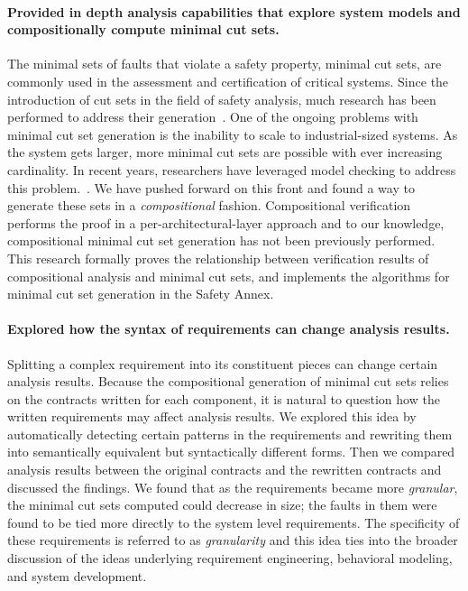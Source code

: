 \paragraph{Provided in depth analysis capabilities that explore system models and compositionally compute minimal cut sets.}
The minimal sets of faults that violate a safety property, minimal cut sets, are commonly used in the assessment and certification of critical systems. Since the introduction of cut sets in the field of safety analysis, much research has been performed to address their generation~\cite{fta:survey,rauzy1993new,historyFTA,Bozzano:2010:DSA:1951720,rausand2003system}. One of the ongoing problems with minimal cut set generation is the inability to scale to industrial-sized systems. As the system gets larger, more minimal cut sets are possible with ever increasing cardinality. In recent years, researchers have leveraged model checking to address this problem.~\cite{bieber2002combination,schafer2003combining,fta:survey,contractBasedDesign,symbFTA,DBLP:conf/cav/BozzanoCPJKPRT15}. We have pushed forward on this front and found a way to generate these sets in a \emph{compositional} fashion. Compositional verification performs the proof in a per-architectural-layer approach and to our knowledge, compositional minimal cut set generation has not been previously performed. This research formally proves the relationship between verification results of compositional analysis and minimal cut sets, and implements the algorithms for minimal cut set generation in the Safety Annex.

\paragraph{Explored how the syntax of requirements can change analysis results.}
Splitting a complex requirement into its constituent pieces can change certain analysis results. Because the compositional generation of minimal cut sets relies on the contracts written for each component, it is natural to question how the written requirements may affect analysis results. We explored this idea by automatically detecting certain patterns in the requirements and rewriting them into semantically equivalent but syntactically different forms. Then we compared analysis results between the original contracts and the rewritten contracts and discussed the findings. We found that as the requirements became more \emph{granular}, the minimal cut sets computed could decrease in size; the faults in them were found to be tied more directly to the system level requirements. The specificity of these requirements is referred to as \emph{granularity} and this idea ties into the broader discussion of the ideas underlying requirement engineering, behavioral modeling, and system development. 

